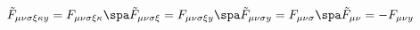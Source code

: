 \begin{equation}
\tilde{F}_{\mu \nu \sigma \xi \kappa y} = F_{\mu \nu \sigma \xi \kappa}
\spa
\tilde{F}_{\mu \nu \sigma \xi} = F_{\mu \nu \sigma \xi y}
\spa
\tilde{F}_{\mu \nu \sigma y} = F_{\mu \nu \sigma}
\spa
\tilde{F}_{\mu \nu} = - F_{\mu \nu y}
\end{equation}

